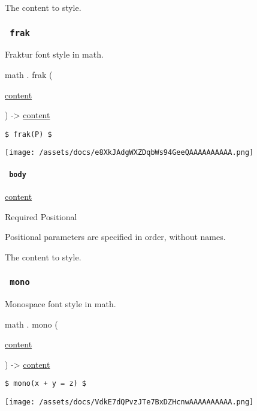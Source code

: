 The content to style.

\subsubsection{\texorpdfstring{\texttt{\ frak\ }}{ frak }}\label{functions-frak}

Fraktur font style in math.

math { . } { frak } (

{ \href{/docs/reference/foundations/content/}{content} }

) -\textgreater{} \href{/docs/reference/foundations/content/}{content}

\begin{verbatim}
$ frak(P) $
\end{verbatim}

\texttt{[image: /assets/docs/e8XkJAdgWXZDqbWs94GeeQAAAAAAAAAA.png]}

\paragraph{\texorpdfstring{\texttt{\ body\ }}{ body }}\label{functions-frak-body}

\href{/docs/reference/foundations/content/}{content}

{Required} {{ Positional }}

\label{functions-frak-body-positional-tooltip}
Positional parameters are specified in order, without names.

The content to style.

\subsubsection{\texorpdfstring{\texttt{\ mono\ }}{ mono }}\label{functions-mono}

Monospace font style in math.

math { . } { mono } (

{ \href{/docs/reference/foundations/content/}{content} }

) -\textgreater{} \href{/docs/reference/foundations/content/}{content}

\begin{verbatim}
$ mono(x + y = z) $
\end{verbatim}

\texttt{[image: /assets/docs/VdkE7dQPvzJTe7BxDZHcnwAAAAAAAAAA.png]}


